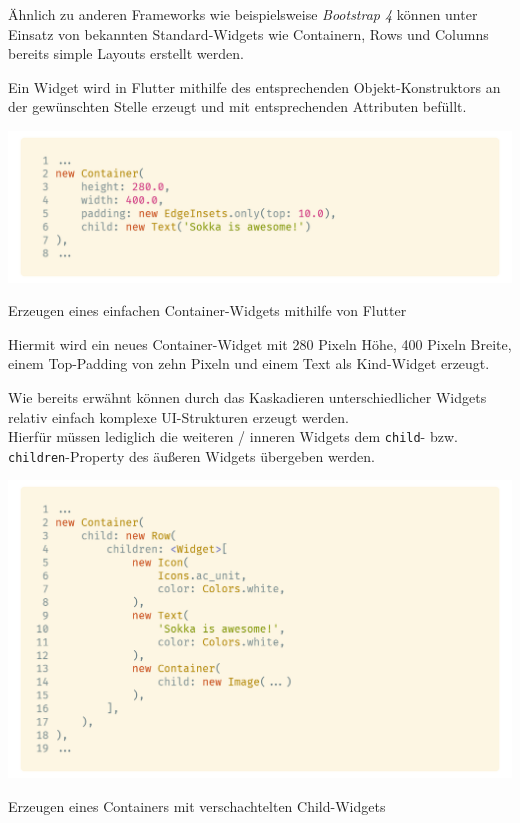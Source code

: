 Ähnlich zu anderen Frameworks wie beispielsweise \textit{Bootstrap 4}
können unter Einsatz von bekannten Standard-Widgets wie Containern, Rows und Columns
bereits simple Layouts erstellt werden.

\newpage

Ein Widget wird in Flutter mithilfe des entsprechenden Objekt-Konstruktors
an der gewünschten Stelle erzeugt und mit entsprechenden Attributen befüllt.

\begin{code}
    \centering
    \includegraphics[width=1\textwidth]{images/Flutter/flutterCreateContainer.png}
    \caption{Erzeugen eines einfachen Container-Widgets mithilfe von Flutter}
\end{code}

Hiermit wird ein neues Container-Widget mit 280 Pixeln Höhe,
400 Pixeln Breite, einem Top-Padding von zehn Pixeln und einem Text als
Kind-Widget erzeugt.

Wie bereits erwähnt können durch das Kaskadieren unterschiedlicher Widgets
relativ einfach komplexe UI-Strukturen erzeugt werden.\\
Hierfür müssen lediglich die weiteren / inneren Widgets dem 
\lstinline{child}- bzw. \lstinline{children}-Property des äußeren Widgets übergeben werden.

\begin{code}
    \centering
    \includegraphics[width=1\textwidth]{images/Flutter/flutterCreateCascadingContainer.png}
    \caption{Erzeugen eines Containers mit verschachtelten Child-Widgets}
\end{code}


